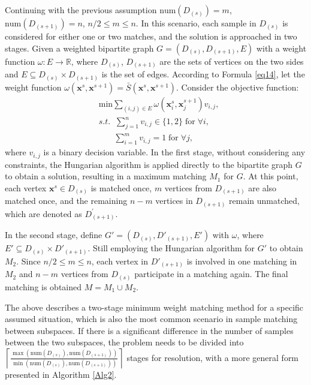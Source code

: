 \documentclass[final,3p,times]{elsarticle}
\begin{document}
Continuing with the previous assumption $\text{num}(D_{(s)})=m$, $\text{num}(D_{(s+1)})=n$, $n/2\le m\le n$. In this scenario, each 
sample in $D_{(s)}$ is considered for either one or two
 matches, and the solution is approached in two stages. Given a 
 weighted bipartite graph $G=(D_{(s)},D_{(s+1)},E)$ with a weight 
 function $\omega:E\rightarrow\mathbb{R}$, where $D_{(s)}$, $D_{(s+1)}$ 
 are the sets of vertices on the two sides and $E\subseteq D_{(s)}
 \times D_{(s+1)}$ is the set of edges. According to Formula 
 \eqref{eq14}, let the weight function $\omega(\boldsymbol{x}^{s},
 \boldsymbol{x}^{s+1})=\bar{S}(\boldsymbol{x}^{s},\boldsymbol{x}
 ^{s+1})$. Consider the objective function:
\begin{equation*}
\begin{aligned}
&\text{min}\textstyle\sum\limits_{(i,j)\in{E}}\omega(\boldsymbol{x}^{s}_i,\boldsymbol{x}_j^{s+1})v_{i,j},\\
&s.t. \;\;
\textstyle\sum\limits_{j=1}^nv_{i,j} \in\{1,2\}\;\text{for}\;\forall i, \\
&\quad\;\;\;\textstyle\sum\limits_{i=1}^mv_{i,j} =1\;\text{for}\;\forall j,
\end{aligned}
\end{equation*}
where $v_{i,j}$ is a binary decision variable. In the first stage, 
without considering any constraints, the Hungarian algorithm is 
applied directly to the bipartite graph $G$ to obtain a solution, 
resulting in a maximum matching $M_1$ for $G$. At this point, 
each vertex $\boldsymbol{x}^s\in D_{(s)}$ is matched once, $m$ 
vertices from $D_{(s+1)}$ are also matched once, and the 
remaining $n-m$ vertices in $D_{(s+1)}$ remain unmatched, which 
are denoted as $D^\prime_{(s+1)}$.

In the second stage, define $G'=(D_{(s)},D'_{(s+1)},E')$ with 
$\omega$, where $E'\subseteq D_{(s)}\times D'_{(s+1)}$. Still 
employing the Hungarian algorithm for $G'$ to obtain $M_2$. Since 
$n/2\le m\le n$, each vertex in $D'_{(s+1)}$ is involved in one 
matching in $M_2$ and $n-m$ vertices from $D_{(s)}$ participate 
in a matching again. The final matching is obtained $M=M_1\cup
{M_2}$.



The above describes a two-stage minimum weight matching method 
for a specific assumed situation, which is also the most common 
scenario in sample matching between subspaces. If there is a 
significant difference in the number of samples between the two 
subspaces, the problem needs to be divided into 
$\left\lceil \frac{\max(\text{num}{(D_{(s)}),\text{num}
(D_{(s+1)})})}{\min(\text{num}{(D_{(s)}),\text{num}(D_{(s+1)})})}
\right\rceil$ stages for resolution, with a more general form presented in Algorithm \ref{Alg2}.
\end{document}
